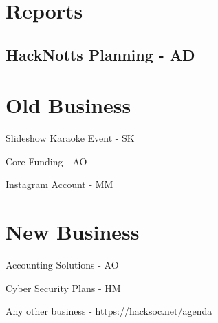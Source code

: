 \documentclass[11pt,hacksoc,agenda]{meetingmins}
\begin{document}
\maketitle

\section{Reports}

\subsection{HackNotts Planning - AD}
\begin{hiddensubitems}
  \item
\end{hiddensubitems}

\section{Old Business}
\begin{items}
  \item Slideshow Karaoke Event - SK
  \item Core Funding - AO
  \item Instagram Account - MM
\end{items}

\section{New Business}
\begin{items}
  \item Accounting Solutions - AO
  \item Cyber Security Plans - HM
  \item Any other business - https://hacksoc.net/agenda
\end{items}

\vspace{1em}
\nextmeeting{}
\end{document}
